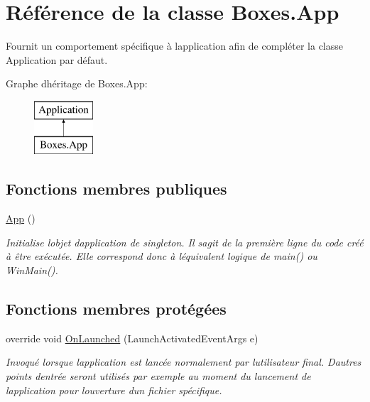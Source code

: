 \hypertarget{class_boxes_1_1_app}{}\section{Référence de la classe Boxes.\+App}
\label{class_boxes_1_1_app}


Fournit un comportement spécifique à l\textquotesingle{}application afin de compléter la classe Application par défaut.  


Graphe d\textquotesingle{}héritage de Boxes.\+App\+:\begin{figure}[H]
\begin{center}
\leavevmode
\includegraphics[height=2.000000cm]{class_boxes_1_1_app}
\end{center}
\end{figure}
\subsection*{Fonctions membres publiques}
\begin{DoxyCompactItemize}
\item 
\hyperlink{class_boxes_1_1_app_a2137586b520cfb163d9278187027fc62}{App} ()
\begin{DoxyCompactList}\small\item\em Initialise l\textquotesingle{}objet d\textquotesingle{}application de singleton. Il s\textquotesingle{}agit de la première ligne du code créé à être exécutée. Elle correspond donc à l\textquotesingle{}équivalent logique de main() ou Win\+Main(). \end{DoxyCompactList}\end{DoxyCompactItemize}
\subsection*{Fonctions membres protégées}
\begin{DoxyCompactItemize}
\item 
override void \hyperlink{class_boxes_1_1_app_acf01405b132b027d95ec0b761416e384}{On\+Launched} (Launch\+Activated\+Event\+Args e)
\begin{DoxyCompactList}\small\item\em Invoqué lorsque l\textquotesingle{}application est lancée normalement par l\textquotesingle{}utilisateur final. D\textquotesingle{}autres points d\textquotesingle{}entrée seront utilisés par exemple au moment du lancement de l\textquotesingle{}application pour l\textquotesingle{}ouverture d\textquotesingle{}un fichier spécifique. \end{DoxyCompactList}\end{DoxyCompactItemize}
